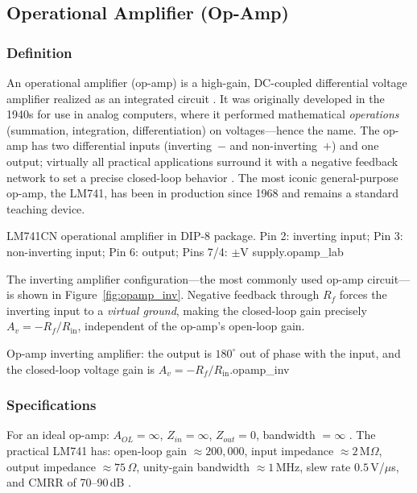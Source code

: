 \subsection{Operational Amplifier (Op-Amp)}

\subsubsection*{Definition}
An operational amplifier (op-amp) is a high-gain, DC-coupled differential voltage
amplifier realized as an integrated circuit \cite{wiki:opamp}. It was originally
developed in the 1940s for use in analog computers, where it performed mathematical
\textit{operations} (summation, integration, differentiation) on voltages---hence the
name. The op-amp has two differential inputs (inverting~$-$ and non-inverting~$+$) and
one output; virtually all practical applications surround it with a negative feedback
network to set a precise closed-loop behavior \cite{horowitz2015}. The most iconic
general-purpose op-amp, the LM741, has been in production since 1968 and remains a
standard teaching device.

%
  {LM741CN operational amplifier in DIP-8 package. Pin 2: inverting input;
   Pin 3: non-inverting input; Pin 6: output; Pins 7/4: $\pm$V supply.}{opamp_lab}

The inverting amplifier configuration---the most commonly used op-amp circuit---is shown
in Figure~\ref{fig:opamp_inv}. Negative feedback through $R_f$ forces the inverting
input to a \textit{virtual ground}, making the closed-loop gain precisely
$A_v = -R_f / R_\text{in}$, independent of the op-amp's open-loop gain.

%
  {Op-amp inverting amplifier: the output is $180^\circ$ out of phase with
   the input, and the closed-loop voltage gain is $A_v = -R_f/R_\text{in}$.}{opamp_inv}

\subsubsection*{Specifications}
For an ideal op-amp: $A_{OL} = \infty$, $Z_{in} = \infty$, $Z_{out} = 0$, bandwidth
$= \infty$ \cite{electronics_tuts:opamp}. The practical LM741 has: open-loop gain
$\approx 200{,}000$, input impedance $\approx 2$\,M$\Omega$, output impedance
$\approx 75$\,$\Omega$, unity-gain bandwidth $\approx 1$\,MHz, slew rate
$0.5$\,V/$\mu$s, and CMRR of 70--90\,dB \cite{horowitz2015}.

